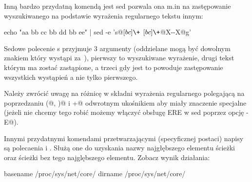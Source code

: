 Inną bardzo przydatną komendą jest sed pozwala ona m.in na zastępowanie
wyszukiwanego na podstawie wyrażenia regularnego tekstu innym:
\begin{CodeFrame*}[bash]{}
echo "aa bb cc bb dd bb ee" | sed -e 's@\([bc]\+\) \([bc]\+\)@X-\2-X@g'
\end{CodeFrame*}

Sedowe polecenie s przyjmuje 3 argumenty (oddzielane mogą być dowolnym znakiem który wystąpi za~\Verb@s@),
pierwszy to wyszukiwane wyrażenie, drugi tekst którym ma zostać zastąpione,
a trzeci gdy jest \Verb@g@ to powoduje zastępowanie wszystkich wystąpień a nie tylko pierwszego.

Należy zwrócić uwagę na różnicę w składni wyrażenia regularnego polegającą na poprzedzaniu
\Verb@(@, \Verb@)@ i \Verb@+@ odwrotnym ukośnikiem aby miały znaczenie specjalne
(jeżeli nie chcemy tego robić możemy włączyć obsługę ERE w sed poprzez opcję \Verb@-E@).

Innymi przydatnymi komendami przetwarzającymi (specyficznej postaci) napisy są polecaenia \Verb@basename@ i \Verb@dirname@.
Służą one do uzyskania nazwy najgłębszego elementu ścieżki oraz ścieżki bez tego najglębszego elementu. Zobacz wynik działania:

\begin{CodeFrame*}[bash]{}
basename /proc/sys/net/core/
dirname /proc/sys/net/core/
\end{CodeFrame*}
